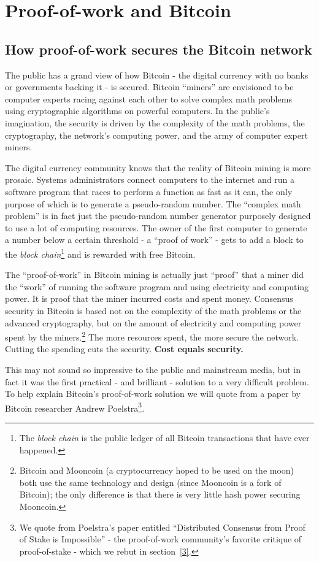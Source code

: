 \documentclass[a4paper,11pt]{article}
\begin{document}
\newpage
\section{Proof-of-work and Bitcoin}
\subsection{How proof-of-work secures the Bitcoin network}

The public has a grand view of how Bitcoin - the digital currency with no banks or governments backing it - is secured. Bitcoin ``miners'' are envisioned to be computer experts racing against each other to solve complex math problems using cryptographic algorithms on powerful computers. In the public's imagination, the security is driven by the complexity of the math problems, the cryptography, the network's computing power, and the army of computer expert miners.

The digital currency community knows that the reality of Bitcoin mining is more prosaic. Systems administrators connect computers to the internet and run a software program that races to perform a function as fast as it can, the only purpose of which is to generate a pseudo-random number. The ``complex math problem'' is in fact just the pseudo-random number generator purposely designed to use a lot of computing resources. The owner of the first computer to generate a number below a certain threshold - a ``proof of work'' - gets to add a block to the \textit{\textit{block chain}}\footnote{The \textit{block chain} is the public ledger of all Bitcoin transactions that have ever happened.} and is rewarded with free Bitcoin. 

The ``proof-of-work'' in Bitcoin mining is actually just ``proof'' that a miner did the ``work'' of running the software program and using electricity and computing power. It is proof that the miner incurred costs and spent money. Consensus security in Bitcoin is based not on the complexity of the math problems or the advanced cryptography, but on the amount of electricity and computing power spent by the miners.\footnote{Bitcoin and Mooncoin (a cryptocurrency hoped to be used on the moon) both use the same technology and design (since Mooncoin is a fork of Bitcoin); the only difference is that there is very little hash power securing Mooncoin.} The more resources spent, the more secure the network. Cutting the spending cuts the security. \textbf{Cost equals security.}

This may not sound so impressive to the public and mainstream media, but in fact it was the first practical - and brilliant - solution to a very difficult problem. To help explain Bitcoin's proof-of-work solution we will quote from a paper by Bitcoin researcher Andrew Poelstra\footnote{We quote from Poelstra's paper entitled ``Distributed Consensus from Proof of Stake is Impossible'' - the proof-of-work community's favorite critique of proof-of-stake - which we rebut in section~\ref{3}.}. 
\end{document}
